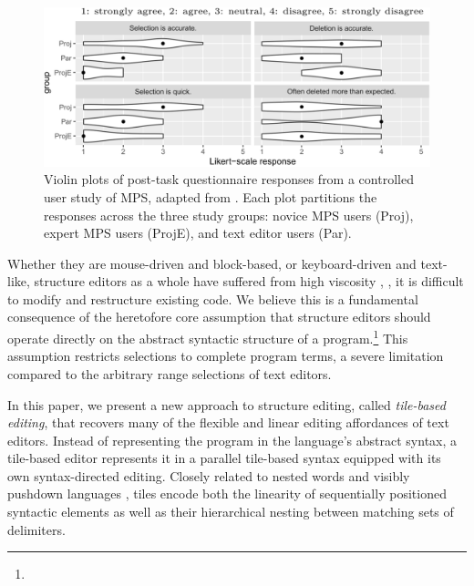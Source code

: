 \begin{figure}[b]
  \centering
  \includegraphics[width=\columnwidth]{img/mps-violin-plots.png}
  \caption{Violin plots of post-task questionnaire responses
  from a controlled user study of MPS, adapted from \cite{ProjEfficiency}.
  Each plot partitions the responses across the three study groups:
  novice MPS users (Proj), expert MPS users (ProjE),
  and text editor users (Par).
  }
  \label{fig:mps-violin-plots}
\end{figure}

Whether they are mouse-driven and block-based,
or keyboard-driven and text-like,
structure editors as a whole have suffered
from high viscosity \cite{cog-dim},
\ie, it is difficult to modify
and restructure existing code.
We believe this is a fundamental consequence
of the heretofore core assumption that structure editors
should operate directly on the abstract syntactic structure
of a program.\footnote{}
This assumption restricts selections to complete
program terms, a severe limitation compared to
the arbitrary range selections of text editors.

In this paper, we present a new approach to structure
editing, called \emph{tile-based editing}, that
recovers many of the flexible and linear editing
affordances of text editors.
Instead of representing the program in the language's
abstract syntax, a tile-based editor represents it
in a parallel tile-based syntax equipped with its own
syntax-directed editing.
Closely related to nested words \cite{nested-words}
and visibly pushdown languages \cite{visibly-pushdown-langs},
tiles encode both the linearity of sequentially
positioned syntactic elements as well as
their hierarchical nesting between matching sets
of delimiters.



